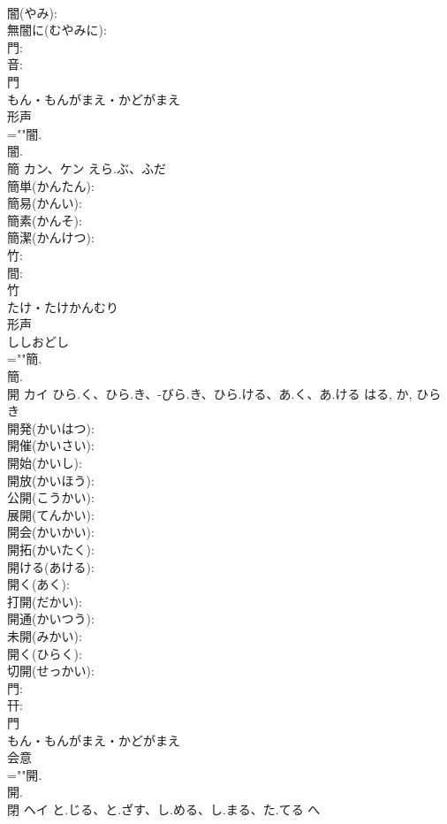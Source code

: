 \documentclass[8pt]{extreport}
\begin{document}
\begin{CJK}{UTF8}{min}
\\	闇(やみ): 
\\	無闇に(むやみに): 
\\	門: 
\\	音: 
\\	門	
\\	もん・もんがまえ・かどがまえ	
\\	形声 
\\	=""闇.
\\	闇.
\\	簡	カン、ケン	えら.ぶ、ふだ		
\\	簡単(かんたん): 
\\	簡易(かんい): 
\\	簡素(かんそ): 
\\	簡潔(かんけつ): 
\\	竹: 
\\	間: 
\\	竹	
\\	たけ・たけかんむり	
\\	形声 
\\	ししおどし 
\\	=""簡.
\\	簡.
\\	開	カイ	ひら.く、ひら.き、-びら.き、ひら.ける、あ.く、あ.ける	はる, か, ひらき	
\\	開発(かいはつ): 
\\	開催(かいさい): 
\\	開始(かいし): 
\\	開放(かいほう): 
\\	公開(こうかい): 
\\	展開(てんかい): 
\\	開会(かいかい): 
\\	開拓(かいたく): 
\\	開ける(あける): 
\\	開く(あく): 
\\	打開(だかい): 
\\	開通(かいつう): 
\\	未開(みかい): 
\\	開く(ひらく): 
\\	切開(せっかい): 
\\	門: 
\\	幵: 
\\	門	
\\	もん・もんがまえ・かどがまえ	
\\	会意 
\\	=""開.
\\	開.
\\	閉	ヘイ	と.じる、と.ざす、し.める、し.まる、た.てる	へ	

\end{CJK}
\end{document}
